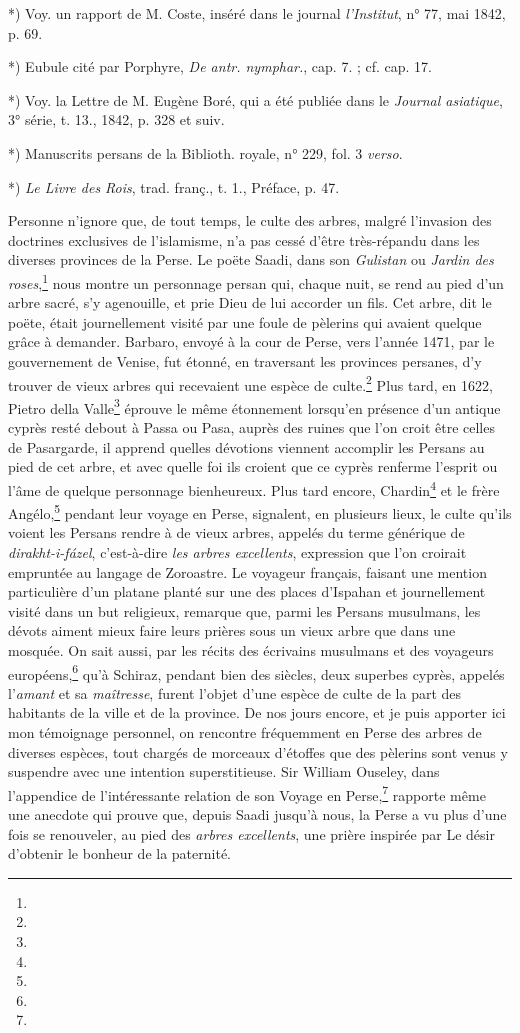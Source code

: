 \documentclass[a4paper, 11pt, oneside, polutonikogreek, french]{article}
\begin{document}
*) Voy. un rapport de M. Coste, inséré dans le journal \emph{l'Institut}, n° 77, mai 1842, p. 69.

*) Eubule cité par Porphyre, \emph{De antr. nymphar.}, cap. 7. ; cf. cap. 17.

*) Voy. la Lettre de M. Eugène Boré, qui a été publiée dans le \emph{Journal asiatique}, 3° série, t. 13., 1842, p. 328 et suiv.

*) Manuscrits persans de la Biblioth. royale, n° 229, fol. 3 \emph{verso}.

*) \emph{Le Livre des Rois}, trad. franç., t. 1., Préface, p. 47.

Personne n'ignore que, de tout temps, le culte des arbres, malgré l'invasion des doctrines exclusives de l'islamisme, n'a pas cessé d'être très-répandu dans les diverses provinces de la Perse. Le poëte Saadi, dans son \emph{Gulistan} ou \emph{Jardin des roses},\footnote{} nous montre un personnage persan qui, chaque nuit, se rend au pied d'un arbre sacré, s'y agenouille, et prie Dieu de lui accorder un fils. Cet arbre, dit le poëte, était journellement visité par une foule de pèlerins qui avaient quelque grâce à demander. Barbaro, envoyé à la cour de Perse, vers l'année 1471, par le gouvernement de Venise, fut étonné, en traversant les provinces persanes, d'y trouver de vieux arbres qui recevaient une espèce de culte.\footnote{} Plus tard, en 1622, Pietro della Valle\footnote{} éprouve le même étonnement lorsqu'en présence d'un antique cyprès resté debout à Passa ou Pasa, auprès des ruines que l'on croit être celles de Pasargarde, il apprend quelles dévotions viennent accomplir les Persans au pied de cet arbre, et avec quelle foi ils croient que ce cyprès renferme l'esprit ou l'âme de quelque personnage bienheureux. Plus tard encore, Chardin\footnote{} et le frère Angélo,\footnote{} pendant leur voyage en Perse, signalent, en plusieurs lieux, le culte qu'ils voient les Persans rendre à de vieux arbres, appelés du terme générique de \emph{dirakht-i-fázel}, c'est-à-dire \emph{les arbres excellents}, expression que l'on croirait empruntée au langage de Zoroastre. Le voyageur français, faisant une mention particulière d'un platane planté sur une des places d'Ispahan et journellement visité dans un but religieux, remarque que, parmi les Persans musulmans, les dévots aiment mieux faire leurs prières sous un vieux arbre que dans une mosquée. On sait aussi, par les récits des écrivains musulmans et des voyageurs européens,\footnote{} qu'à Schiraz, pendant bien des siècles, deux superbes cyprès, appelés l'\emph{amant} et sa \emph{maîtresse}, furent l'objet d'une espèce de culte de la part des habitants de la ville et de la province. De nos jours encore, et je puis apporter ici mon témoignage personnel, on rencontre fréquemment en Perse des arbres de diverses espèces, tout chargés de morceaux d'étoffes que des pèlerins sont venus y suspendre avec une intention superstitieuse. Sir William Ouseley, dans l'appendice de l'intéressante relation de son Voyage en Perse,\footnote{} rapporte même une anecdote qui prouve que, depuis Saadi jusqu'à nous, la Perse a vu plus d'une fois se renouveler, au pied des \emph{arbres excellents}, une prière inspirée par Le désir d'obtenir le bonheur de la paternité.
\end{document}
